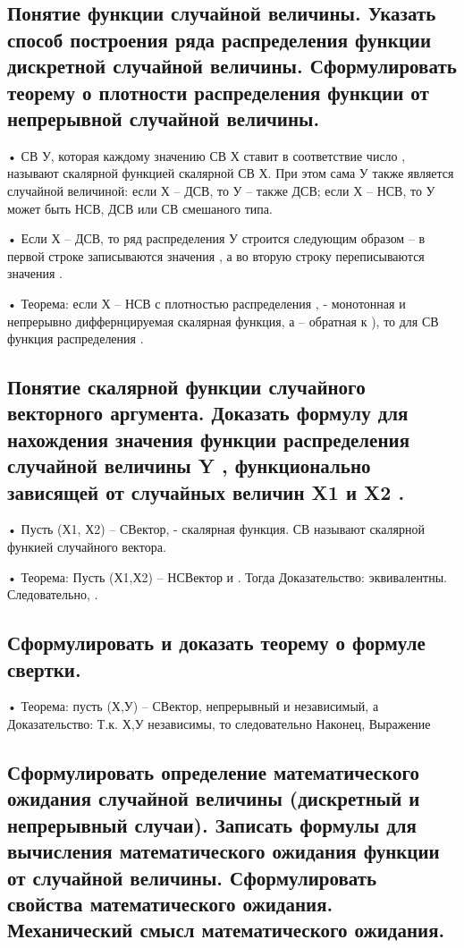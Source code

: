 \subsection{Понятие функции случайной величины. Указать способ построения ряда распределения функции дискретной случайной величины. Сформулировать теорему о плотности распределения функции от непрерывной случайной величины.}

• СВ У, которая каждому значению СВ Х ставит в соответствие число , называют скалярной функцией скалярной СВ Х. При этом сама У также является случайной величиной: если Х – ДСВ, то У – также ДСВ; если Х – НСВ, то У может быть НСВ, ДСВ или СВ смешаного типа.

• Если Х – ДСВ, то ряд распределения У строится следующим образом – в первой строке записываются значения , а во вторую строку переписываются значения .

• Теорема: если Х – НСВ с плотностью распределения ,   - монотонная и непрерывно диффернцируемая скалярная функция, а  – обратная к ), то для СВ  функция распределения .

\subsection{Понятие скалярной функции случайного векторного аргумента. Доказать формулу для нахождения значения функции распределения случайной величины Y , функционально зависящей от случайных величин X1 и X2 .}

• Пусть (Х1, Х2) – СВектор,  - скалярная функция. СВ  называют скалярной функией случайного вектора.

• Теорема: Пусть (Х1,Х2) – НСВектор и . Тогда 
Доказательство:  эквивалентны. Следовательно, .


\subsection{Сформулировать и доказать теорему о формуле свертки.}

• Теорема: пусть (Х,У) – СВектор, непрерывный и независимый, а 
Доказательство:  Т.к. Х,У независимы, то  следовательно 
Наконец, 
Выражение 



\subsection{Сформулировать определение математического ожидания случайной величины (дискретный и непрерывный случаи). Записать формулы для вычисления математического ожидания функции от случайной величины. Сформулировать свойства математического ожидания. Механический смысл математического ожидания.}


